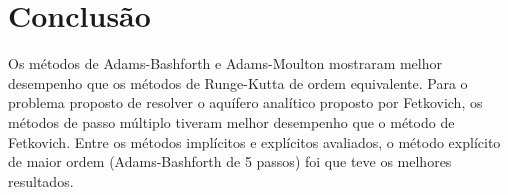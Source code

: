 \documentclass[final,5p]{elsarticle}
\numberwithin{equation}{section}
\begin{document}
    \section{Conclusão}

        Os métodos de Adams-Bashforth e Adams-Moulton mostraram melhor desempenho que os métodos de Runge-Kutta de ordem equivalente. Para o problema proposto de resolver o aquífero analítico proposto por Fetkovich, os métodos de passo múltiplo tiveram melhor desempenho que o método de Fetkovich. Entre os métodos implícitos e explícitos avaliados, o método explícito de maior ordem (Adams-Bashforth de 5 passos) foi que teve os melhores resultados.



\appendix













% 

% 

% 
\end{document}

